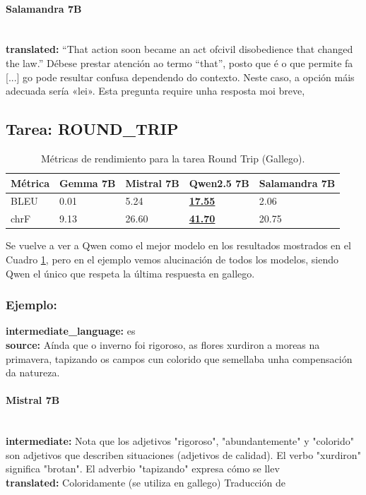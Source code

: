 \paragraph{Salamandra 7B}~\\
\textbf{translated:} “That action soon became an act ofcivil disobedience that changed the law.”  Débese prestar atención ao termo “that”, posto que é o que permite fa [...] go pode resultar confusa dependendo do contexto. Neste caso, a opción máis adecuada sería «lei».    Esta pregunta require unha resposta moi breve,

\subsection{Tarea: ROUND\_TRIP}\label{tarea-round_trip}
\begin{longtable}[]{@{}lllll@{}}
\toprule\noalign{}
Métrica & Gemma 7B & Mistral 7B & Qwen2.5 7B & Salamandra 7B \\
\midrule\noalign{}
\endhead
\bottomrule\noalign{}
\caption{Métricas de rendimiento para la tarea Round Trip (Gallego).}
\label{tab:metricas_round_trip_Gallego}
\endlastfoot
BLEU & 0.01 & 5.24 & \textbf{\underline{17.55}} & 2.06 \\
chrF & 9.13 & 26.60 & \textbf{\underline{41.70}} & 20.75 \\
\end{longtable}
Se vuelve a ver a Qwen como el mejor modelo en los resultados mostrados en el Cuadro \ref{tab:metricas_round_trip_Gallego}, pero en el ejemplo vemos alucinación de todos los modelos, siendo Qwen el único que respeta la última respuesta en gallego.

\subsubsection{Ejemplo:}
\textbf{intermediate\_language:} es\\
\textbf{source:} Aínda que o inverno foi rigoroso, as flores xurdiron a moreas na primavera, tapizando os campos cun colorido que semellaba unha compensación da natureza.

\paragraph{Mistral 7B}~\\
\textbf{intermediate:} Nota que los adjetivos "rigoroso", "abundantemente" y "colorido" son adjetivos que describen situaciones (adjetivos de calidad). El verbo "xurdiron" significa "brotan". El adverbio "tapizando" expresa cómo se llev\\
\textbf{translated:} Coloridamente (se utiliza en gallego)  Traducción de \textquotesingle{}

